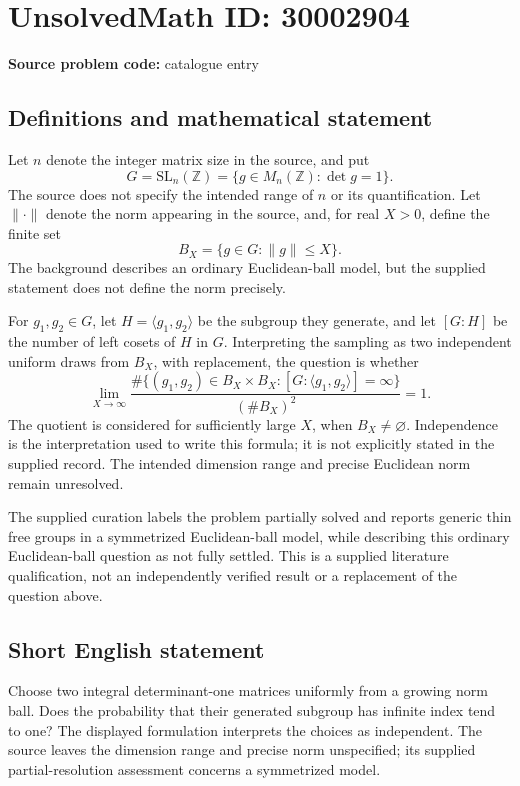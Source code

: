\documentclass[11pt]{article}
\newcommand{\Z}{\mathbb{Z}}
\begin{document}
\section*{UnsolvedMath ID: 30002904}
\textbf{Source problem code:} catalogue entry
\subsection{Definitions and mathematical statement}
Let \(n\) denote the integer matrix size in the source, and put
\[
G=\mathrm{SL}_n(\Z)=\{g\in M_n(\Z):\det g=1\}.
\]
The source does not specify the intended range of \(n\) or its quantification. Let \(\lVert\cdot\rVert\) denote the norm appearing in the source, and, for real \(X>0\), define the finite set
\[
B_X=\{g\in G:\lVert g\rVert\le X\}.
\]
The background describes an ordinary Euclidean-ball model, but the supplied statement does not define the norm precisely.

For \(g_1,g_2\in G\), let \(H=\langle g_1,g_2\rangle\) be the subgroup they generate, and let \([G:H]\) be the number of left cosets of \(H\) in \(G\). Interpreting the sampling as two independent uniform draws from \(B_X\), with replacement, the question is whether
\[
\lim_{X\to\infty}
\frac{\#\{(g_1,g_2)\in B_X\times B_X:
[G:\langle g_1,g_2\rangle]=\infty\}}
{(\#B_X)^2}
=1.
\]
The quotient is considered for sufficiently large \(X\), when \(B_X\ne\varnothing\). Independence is the interpretation used to write this formula; it is not explicitly stated in the supplied record. The intended dimension range and precise Euclidean norm remain unresolved.

The supplied curation labels the problem partially solved and reports generic thin free groups in a symmetrized Euclidean-ball model, while describing this ordinary Euclidean-ball question as not fully settled. This is a supplied literature qualification, not an independently verified result or a replacement of the question above.
\subsection{Short English statement}
Choose two integral determinant-one matrices uniformly from a growing norm ball. Does the probability that their generated subgroup has infinite index tend to one? The displayed formulation interprets the choices as independent. The source leaves the dimension range and precise norm unspecified; its supplied partial-resolution assessment concerns a symmetrized model.
\end{document}
